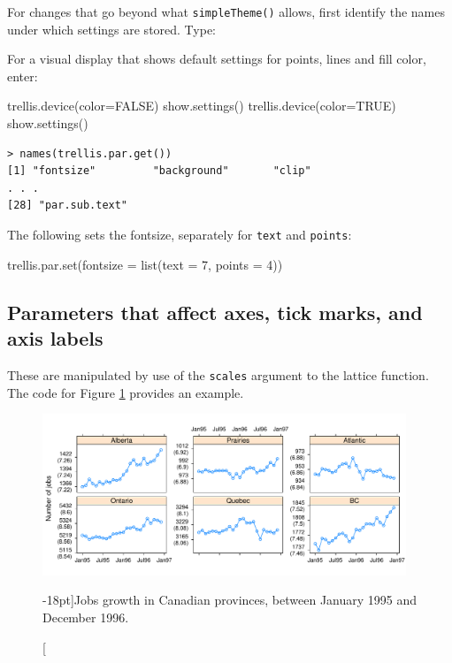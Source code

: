 \documentclass{tufte-book}\usepackage[]{graphicx}\usepackage[]{color}
\newcommand{\txtt}[1]{\texttt{#1}}
\begin{document}
For changes that go beyond what \txtt{simpleTheme()} allows, first
identify the names under which settings are stored. Type:
\begin{marginfigure}
For a visual display that shows default settings for
  points, lines and fill color, enter:
\begin{Schunk}
\begin{Sinput}
trellis.device(color=FALSE)
show.settings()
trellis.device(color=TRUE)
show.settings()
\end{Sinput}
\end{Schunk}
\end{marginfigure}
\begin{verbatim}
> names(trellis.par.get())
[1] "fontsize"         "background"       "clip"
. . .
[28] "par.sub.text"
\end{verbatim}

The following sets the fontsize, separately for \txtt{text} and
\txtt{points}:\\[-6pt]

\noindent
\begin{minipage}[t]{1.175\textwidth}
\begin{Schunk}
\begin{Sinput}
trellis.par.set(fontsize = list(text = 7,
                                points = 4))
\end{Sinput}
\end{Schunk}
\end{minipage}

\subsection*{Parameters that affect axes, tick marks, and axis labels}
\label{ss:lattice-axis}

These are manipulated by use of the \txtt{scales} argument to
the lattice function. The code for Figure \ref{fig:jobsplot}
provides an example.
\begin{figure}[h]
\begin{Schunk}


\centerline{\includegraphics[width=0.97\textwidth]{figs/07-jobsplot-1} }

\end{Schunk}
\caption[][-18pt]{Jobs growth in Canadian provinces, between January 1995
  and December 1996.}\label{fig:jobsplot}
\vspace*{18pt}
\end{figure}
\end{document}
